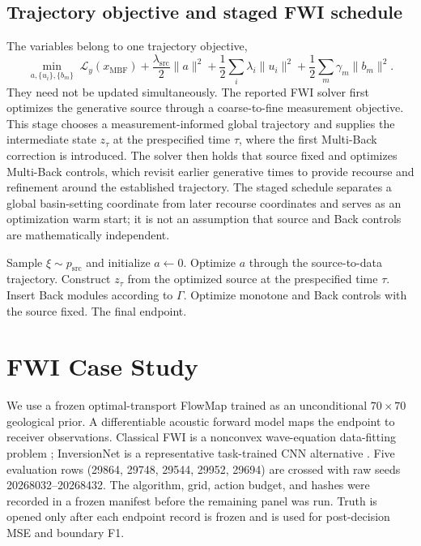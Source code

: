\documentclass[10pt,twocolumn]{article}
\begin{document}
\subsection{Trajectory objective and staged FWI schedule}
The variables belong to one trajectory objective,
\begin{equation}
\min_{a,\{u_i\},\{b_m\}}\;\mathcal L_y(x_{\mathrm{MBF}})+\frac{\lambda_{\mathrm{src}}}{2}\|a\|^2+\frac12\sum_i\lambda_i\|u_i\|^2+\frac12\sum_m\gamma_m\|b_m\|^2.
\end{equation}
They need not be updated simultaneously. The reported FWI solver first optimizes the generative source through a coarse-to-fine measurement objective. This stage chooses a measurement-informed global trajectory and supplies the intermediate state $z_\tau$ at the prespecified time $\tau$, where the first Multi-Back correction is introduced. The solver then holds that source fixed and optimizes Multi-Back controls, which revisit earlier generative times to provide recourse and refinement around the established trajectory. The staged schedule separates a global basin-setting coordinate from later recourse coordinates and serves as an optimization warm start; it is not an assumption that source and Back controls are mathematically independent.

\begin{algorithm}[t]
\caption{Staged Multi-Back Flow}
\begin{algorithmic}[1]
\STATE Sample $\xi\sim p_{\mathrm{src}}$ and initialize $a\leftarrow0$.
\STATE Optimize $a$ through the source-to-data trajectory.
\STATE Construct $z_\tau$ from the optimized source at the prespecified time $\tau$.
\STATE Insert Back modules according to $\Gamma$.
\STATE Optimize monotone and Back controls with the source fixed.
\RETURN The final endpoint.
\end{algorithmic}
\end{algorithm}

\section{FWI Case Study}
We use a frozen optimal-transport FlowMap trained as an unconditional $70\times70$ geological prior. A differentiable acoustic forward model maps the endpoint to receiver observations. Classical FWI is a nonconvex wave-equation data-fitting problem \cite{virieux2009fwi}; InversionNet is a representative task-trained CNN alternative \cite{wu2019inversionnet}. Five evaluation rows (29864, 29748, 29544, 29952, 29694) are crossed with raw seeds 20268032--20268432. The algorithm, grid, action budget, and hashes were recorded in a frozen manifest before the remaining panel was run. Truth is opened only after each endpoint record is frozen and is used for post-decision MSE and boundary F1.
\end{document}
